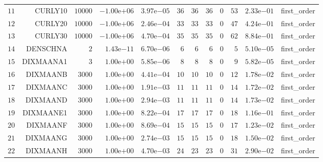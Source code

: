 \begin{longtable}{rrrrrrrrrrrr}
  \(    11\) & CURLY10 & \( 10000\) & \(-1.00\)e\(+06\) & \( 3.97\)e\(-05\) & \(    36\) & \(    36\) & \(    36\) & \(     0\) & \(    53\) & \( 2.33\)e\(-01\) & first\_order \\
  \(    12\) & CURLY20 & \( 10000\) & \(-1.00\)e\(+06\) & \( 2.46\)e\(-04\) & \(    33\) & \(    33\) & \(    33\) & \(     0\) & \(    47\) & \( 4.24\)e\(-01\) & first\_order \\
  \(    13\) & CURLY30 & \( 10000\) & \(-1.00\)e\(+06\) & \( 4.70\)e\(-04\) & \(    35\) & \(    35\) & \(    35\) & \(     0\) & \(    62\) & \( 8.84\)e\(-01\) & first\_order \\
  \(    14\) & DENSCHNA & \(     2\) & \( 1.43\)e\(-11\) & \( 6.70\)e\(-06\) & \(     6\) & \(     6\) & \(     6\) & \(     0\) & \(     5\) & \( 5.10\)e\(-05\) & first\_order \\
  \(    15\) & DIXMAANA1 & \(     3\) & \( 1.00\)e\(+00\) & \( 5.85\)e\(-06\) & \(     8\) & \(     8\) & \(     8\) & \(     0\) & \(     9\) & \( 5.82\)e\(-05\) & first\_order \\
  \(    16\) & DIXMAANB & \(  3000\) & \( 1.00\)e\(+00\) & \( 4.41\)e\(-04\) & \(    10\) & \(    10\) & \(    10\) & \(     0\) & \(    12\) & \( 1.78\)e\(-02\) & first\_order \\
  \(    17\) & DIXMAANC & \(  3000\) & \( 1.00\)e\(+00\) & \( 1.91\)e\(-03\) & \(    11\) & \(    11\) & \(    11\) & \(     0\) & \(    14\) & \( 1.72\)e\(-02\) & first\_order \\
  \(    18\) & DIXMAAND & \(  3000\) & \( 1.00\)e\(+00\) & \( 2.94\)e\(-03\) & \(    11\) & \(    11\) & \(    11\) & \(     0\) & \(    14\) & \( 1.73\)e\(-02\) & first\_order \\
  \(    19\) & DIXMAANE1 & \(  3000\) & \( 1.00\)e\(+00\) & \( 8.22\)e\(-04\) & \(    17\) & \(    17\) & \(    17\) & \(     0\) & \(    18\) & \( 1.16\)e\(-01\) & first\_order \\
  \(    20\) & DIXMAANF & \(  3000\) & \( 1.00\)e\(+00\) & \( 8.69\)e\(-04\) & \(    15\) & \(    15\) & \(    15\) & \(     0\) & \(    17\) & \( 1.23\)e\(-02\) & first\_order \\
  \(    21\) & DIXMAANG & \(  3000\) & \( 1.00\)e\(+00\) & \( 2.74\)e\(-03\) & \(    15\) & \(    15\) & \(    15\) & \(     0\) & \(    18\) & \( 1.50\)e\(-02\) & first\_order \\
  \(    22\) & DIXMAANH & \(  3000\) & \( 1.00\)e\(+00\) & \( 4.70\)e\(-03\) & \(    24\) & \(    23\) & \(    23\) & \(     0\) & \(    31\) & \( 2.90\)e\(-02\) & first\_order \\

\end{longtable}
